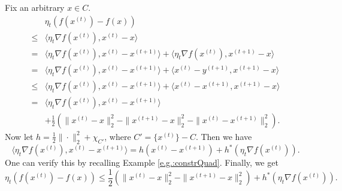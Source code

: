 \documentclass[openany]{book}
\theoremstyle{definition}
\theoremstyle{remark}
\begin{document}
Fix an arbitrary $x\in C$.
\begin{equation*}
    \begin{split}
         & \eta_t\left(f(x^{(t)})-f(x)\right) \\
        \le & \langle\eta_t\nabla f(x^{(t)}),x^{(t)}-x\rangle \\
        = & \langle\eta_t\nabla f(x^{(t)}),x^{(t)}-x^{(t+1)}\rangle+\langle\eta_t\nabla f(x^{(t)}),x^{(t+1)}-x\rangle \\
        = & \langle\eta_t\nabla f(x^{(t)}),x^{(t)}-x^{(t+1)}\rangle+\langle x^{(t)}-y^{(t+1)},x^{(t+1)}-x\rangle \\
        \le & \langle\eta_t\nabla f(x^{(t)}),x^{(t)}-x^{(t+1)}\rangle+\langle x^{(t)}-x^{(t+1)},x^{(t+1)}-x\rangle \\
        = & \langle\eta_t\nabla f(x^{(t)}),x^{(t)}-x^{(t+1)}\rangle \\
         & +\frac{1}{2}\left(\|x^{(t)}-x\|_2^2-\|x^{(t+1)}-x\|_2^2-\|x^{(t)}-x^{(t+1)}\|_2^2\right).
    \end{split}
\end{equation*}
Now let $h=\frac{1}{2}\|\cdot\|_2^2+\chi_{C'}$, where $C'=\{x^{(t)}\}-C$. Then we have
\begin{equation*}
    \langle\eta_t\nabla f(x^{(t)}),x^{(t)}-x^{(t+1)}\rangle=h\left(x^{(t)}-x^{(t+1)}\right)+h^*\left(\eta_t\nabla f(x^{(t)})\right).
\end{equation*}
One can verify this by recalling Example \ref{e.g.:constrQuad}. Finally, we get
\begin{equation}\label{GDSmoothOneStep}
    \eta_t\left(f(x^{(t)})-f(x)\right)\le \frac{1}{2}\left(\|x^{(t)}-x\|_2^2-\|x^{(t+1)}-x\|_2^2\right)+h^*\left(\eta_t\nabla f(x^{(t)})\right).
\end{equation}
\end{document}

